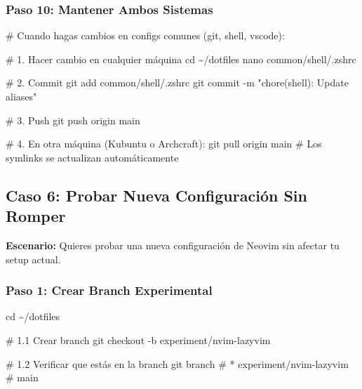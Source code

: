 \documentclass[
  doc,
  floatsintext,
  longtable,
  a4paper,
  nolmodern,
  notxfonts,
  notimes,
  12pt,
  colorlinks=true,linkcolor=blue,citecolor=blue,urlcolor=blue]{apa7}
\newenvironment{Shaded}{\begin{snugshade}}{\end{snugshade}}
\newcommand{\AttributeTok}[1]{\textcolor[rgb]{0.40,0.45,0.13}{#1}}
\newcommand{\BuiltInTok}[1]{\textcolor[rgb]{0.00,0.23,0.31}{#1}}
\newcommand{\CommentTok}[1]{\textcolor[rgb]{0.37,0.37,0.37}{#1}}
\newcommand{\FunctionTok}[1]{\textcolor[rgb]{0.28,0.35,0.67}{#1}}
\newcommand{\NormalTok}[1]{\textcolor[rgb]{0.00,0.23,0.31}{#1}}
\newcommand{\StringTok}[1]{\textcolor[rgb]{0.13,0.47,0.30}{#1}}
\begin{document}
\subsubsection{Paso 10: Mantener Ambos
Sistemas}\label{paso-10-mantener-ambos-sistemas}

\begin{Shaded}
\begin{Highlighting}[]
\CommentTok{\# Cuando hagas cambios en configs comunes (git, shell, vscode):}

\CommentTok{\# 1. Hacer cambio en cualquier máquina}
\BuiltInTok{cd}\NormalTok{ \textasciitilde{}/dotfiles}
\FunctionTok{nano}\NormalTok{ common/shell/.zshrc}

\CommentTok{\# 2. Commit}
\FunctionTok{git}\NormalTok{ add common/shell/.zshrc}
\FunctionTok{git}\NormalTok{ commit }\AttributeTok{{-}m} \StringTok{"chore(shell): Update aliases"}

\CommentTok{\# 3. Push}
\FunctionTok{git}\NormalTok{ push origin main}

\CommentTok{\# 4. En otra máquina (Kubuntu o Archcraft):}
\FunctionTok{git}\NormalTok{ pull origin main}
\CommentTok{\# Los symlinks se actualizan automáticamente}
\end{Highlighting}
\end{Shaded}

\subsection{Caso 6: Probar Nueva Configuración Sin
Romper}\label{caso-6-probar-nueva-configuraciuxf3n-sin-romper}

\textbf{Escenario:} Quieres probar una nueva configuración de Neovim sin
afectar tu setup actual.

\subsubsection{Paso 1: Crear Branch
Experimental}\label{paso-1-crear-branch-experimental}

\begin{Shaded}
\begin{Highlighting}[]
\BuiltInTok{cd}\NormalTok{ \textasciitilde{}/dotfiles}

\CommentTok{\# 1.1 Crear branch}
\FunctionTok{git}\NormalTok{ checkout }\AttributeTok{{-}b}\NormalTok{ experiment/nvim{-}lazyvim}

\CommentTok{\# 1.2 Verificar que estás en la branch}
\FunctionTok{git}\NormalTok{ branch}
\CommentTok{\# * experiment/nvim{-}lazyvim}
\CommentTok{\#   main}
\end{Highlighting}
\end{Shaded}
\end{document}
